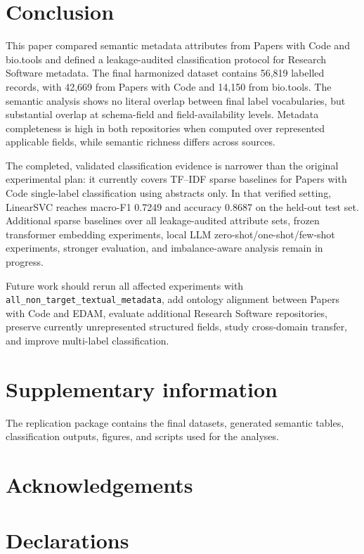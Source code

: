 \documentclass[pdflatex,sn-mathphys-num]{sn-jnl}
\theoremstyle{thmstyleone}%
\theoremstyle{thmstyletwo}%
\theoremstyle{thmstylethree}%
\begin{document}
\section{Conclusion}
\label{sec:conclusion}

This paper compared semantic metadata attributes from Papers with Code and bio.tools and defined a leakage-audited classification protocol for Research Software metadata. The final harmonized dataset contains 56,819 labelled records, with 42,669 from Papers with Code and 14,150 from bio.tools. The semantic analysis shows no literal overlap between final label vocabularies, but substantial overlap at schema-field and field-availability levels. Metadata completeness is high in both repositories when computed over represented applicable fields, while semantic richness differs across sources.

The completed, validated classification evidence is narrower than the original experimental plan: it currently covers TF--IDF sparse baselines for Papers with Code single-label classification using abstracts only. In that verified setting, LinearSVC reaches macro-F1 0.7249 and accuracy 0.8687 on the held-out test set. Additional sparse baselines over all leakage-audited attribute sets, frozen transformer embedding experiments, local LLM zero-shot/one-shot/few-shot experiments, stronger evaluation, and imbalance-aware analysis remain in progress.

Future work should rerun all affected experiments with \texttt{all\_non\_target\_textual\_metadata}, add ontology alignment between Papers with Code and EDAM, evaluate additional Research Software repositories, preserve currently unrepresented structured fields, study cross-domain transfer, and improve multi-label classification.

\backmatter

\section*{Supplementary information}
The replication package contains the final datasets, generated semantic tables, classification outputs, figures, and scripts used for the analyses.

\section*{Acknowledgements}

\section*{Declarations}
\end{document}

